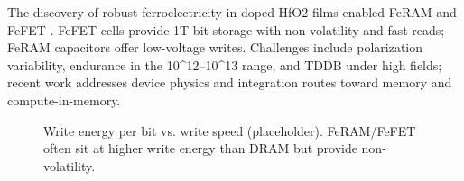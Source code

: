 The discovery of robust ferroelectricity in doped HfO2 films enabled FeRAM and FeFET \cite{boscke2011,mueller2012}. FeFET cells provide 1T bit storage with non-volatility and fast reads; FeRAM capacitors offer low-voltage writes. Challenges include polarization variability, endurance in the 10^{12}–10^{13} range, and TDDB under high fields; recent work addresses device physics and integration routes toward memory and compute-in-memory.

\begin{figure}[!t]
  \centering
  \fbox{\rule{0pt}{1.10in}\rule{0.95\linewidth}{0pt}}
  \caption{Write energy per bit vs. write speed (placeholder). FeRAM/FeFET often sit at higher write energy than DRAM but provide non-volatility.}
  \label{fig:energy_speed}
\end{figure}
　
